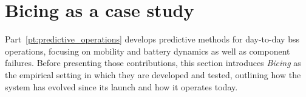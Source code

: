 \begingroup
\let\cleardoublepage\relax
\let\clearpage\relax
\vspace{25pt}
\chapter*{Bicing as a case study}
\label{ch:use_case_bicing}
\endgroup
\vspace{-45pt} %

\begingroup
\setcounter{figure}{0}
\setcounter{table}{0}
\renewcommand{\thefigure}{IV.\arabic{figure}}
\renewcommand{\thetable}{IV.\arabic{table}}

Part~\ref{pt:predictive_operations} develops predictive methods for day-to-day \ac{bss} operations, focusing on mobility and battery dynamics as well as component failures. Before presenting those contributions, this section introduces \textit{Bicing} as the empirical setting in which they are developed and tested, outlining how the system has evolved since its launch and how it operates today.

